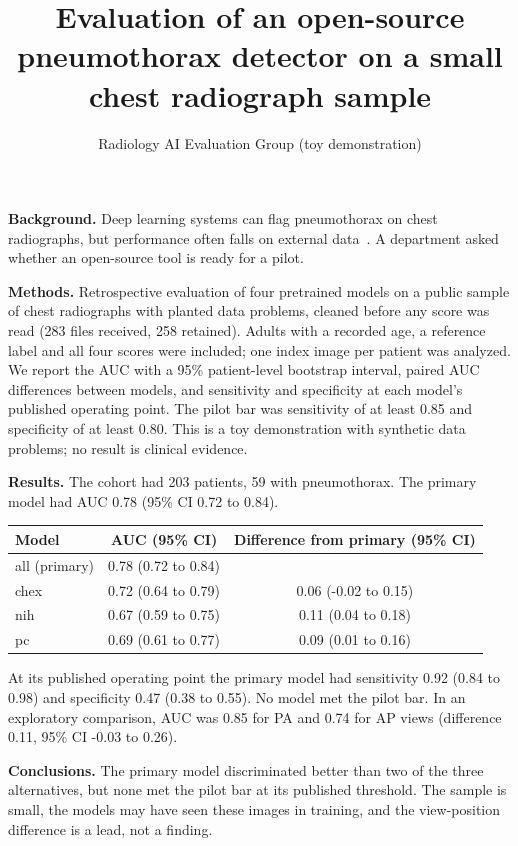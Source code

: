 \documentclass[11pt]{article}
\title{Evaluation of an open-source pneumothorax detector on a small chest radiograph sample}
\author{Radiology AI Evaluation Group (toy demonstration)}
\date{}
\begin{document}
\maketitle
\noindent\textbf{Background.} Deep learning systems can flag pneumothorax on chest radiographs, but performance often falls on external data~\cite{Thian2021_34350409,Katzman2024_38189265}. A department asked whether an open-source tool is ready for a pilot.

\noindent\textbf{Methods.} Retrospective evaluation of four pretrained models on a public sample of chest radiographs with planted data problems, cleaned before any score was read (283 files received, 258 retained). Adults with a recorded age, a reference label and all four scores were included; one index image per patient was analyzed. We report the AUC with a 95\% patient-level bootstrap interval, paired AUC differences between models, and sensitivity and specificity at each model's published operating point. The pilot bar was sensitivity of at least 0.85 and specificity of at least 0.80. This is a toy demonstration with synthetic data problems; no result is clinical evidence.

\noindent\textbf{Results.} The cohort had 203 patients, 59 with pneumothorax. The primary model had AUC 0.78 (95\% CI 0.72 to 0.84).

\begin{center}
\begin{tabular}{lcc}
\toprule
Model & AUC (95\% CI) & Difference from primary (95\% CI)\\
\midrule
all (primary) & 0.78 (0.72 to 0.84) & \\
chex & 0.72 (0.64 to 0.79) & 0.06 (-0.02 to 0.15)\\
nih & 0.67 (0.59 to 0.75) & 0.11 (0.04 to 0.18)\\
pc & 0.69 (0.61 to 0.77) & 0.09 (0.01 to 0.16)\\
\bottomrule
\end{tabular}
\end{center}
At its published operating point the primary model had sensitivity 0.92 (0.84 to 0.98) and specificity 0.47 (0.38 to 0.55). No model met the pilot bar. In an exploratory comparison, AUC was 0.85 for PA and 0.74 for AP views (difference 0.11, 95\% CI -0.03 to 0.26).

\noindent\textbf{Conclusions.} The primary model discriminated better than two of the three alternatives, but none met the pilot bar at its published threshold. The sample is small, the models may have seen these images in training, and the view-position difference is a lead, not a finding.



\end{document}
